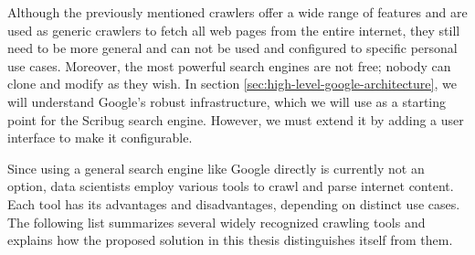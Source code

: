 Although the previously mentioned crawlers offer a wide range of features and are used as generic crawlers to fetch all web pages from the entire internet, they still need to be more general and can not be used and configured to specific personal use cases. Moreover, the most powerful search engines are not free; nobody can clone and modify as they wish. In section \ref{sec:high-level-google-architecture}, we will understand Google's robust infrastructure, which we will use as a starting point for the Scribug search engine. However, we must extend it by adding a user interface to make it configurable.

Since using a general search engine like Google directly is currently not an option, data scientists employ various tools to crawl and parse internet content. Each tool has its advantages and disadvantages, depending on distinct use cases. The following list summarizes several widely recognized crawling tools and explains how the proposed solution in this thesis distinguishes itself from them.


